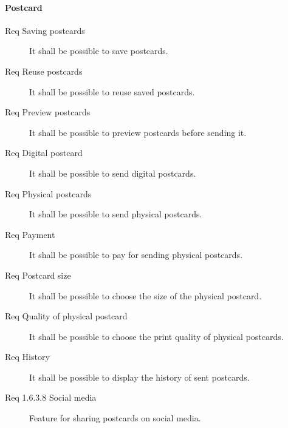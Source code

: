 \documentclass[10pt,a4paper]{article}
\begin{document}
\paragraph{Postcard}
\begin{description}
	\item [Req  Saving postcards] It shall be possible to save postcards.
	\item [Req  Reuse postcards] It shall be possible to reuse saved postcards.
	
	\item [Req  Preview postcards] It shall be possible to preview postcards before sending it.
	
	\item [Req  Digital postcard] It shall be possible to send digital postcards.
	\item [Req  Physical postcards] It shall be possible to send physical postcards.
	
	\item [Req  Payment] It shall be possible to pay for sending physical postcards.
	
	\item [Req  Postcard size] It shall be possible to choose the size of the physical postcard.
	\item [Req  Quality of physical postcard] It shall be possible to choose the print quality of physical postcards. 
	\item [Req  History] It shall be possible to display the history of sent postcards.
	
	\item [Req 1.6.3.8 Social media] Feature for sharing postcards on social media.
	

		


\end{description}
\end{document}
